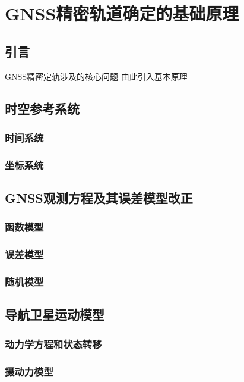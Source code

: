 
\chapter{GNSS精密轨道确定的基础原理}

\section{引言}
GNSS精密定轨涉及的核心问题
由此引入基本原理

\section{时空参考系统}

\subsection{时间系统}

\subsection{坐标系统}

\section{GNSS观测方程及其误差模型改正}

\subsection{函数模型}

\subsection{误差模型}

\subsection{随机模型}

\section{导航卫星运动模型}

\subsection{动力学方程和状态转移}

\subsection{摄动力模型}